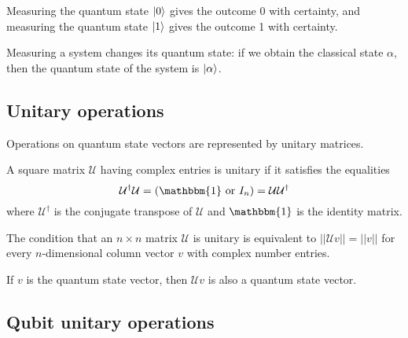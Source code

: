 Measuring the quantum state $\ket{0}$ gives the outcome 0 with certainty, and measuring the quantum state $\ket{1}$ gives the outcome 1 with certainty.


Measuring a system changes its quantum state: if we obtain the classical state $\alpha$, then the quantum state of the system is $\ket{\alpha}$.


\subsection{Unitary operations}
Operations on quantum state vectors are represented by unitary matrices.

\bigbreak
A square matrix $\mathcal{U}$ having complex entries is unitary if it satisfies the equalities
\begin{equation*}
    \mathcal{U}^\dagger\mathcal{U}=(\mathbbm{1}\text{ or }I_n)=\mathcal{U}\mathcal{U}^\dagger
\end{equation*}
where $\mathcal{U}^\dagger$ is the conjugate transpose of $\mathcal{U}$ and $\mathbbm{1}$ is the identity matrix.

\bigbreak

The condition that an $n\times n$ matrix $\mathcal{U}$ is unitary is equivalent to $||\mathcal{U}v||=||v||$ for every $n$-dimensional column vector $v$ with complex number entries.

\bigbreak

If $v$ is the quantum state vector, then $\mathcal{U}v$ is also a quantum state vector.

\newpage

\subsection{Qubit unitary operations}

